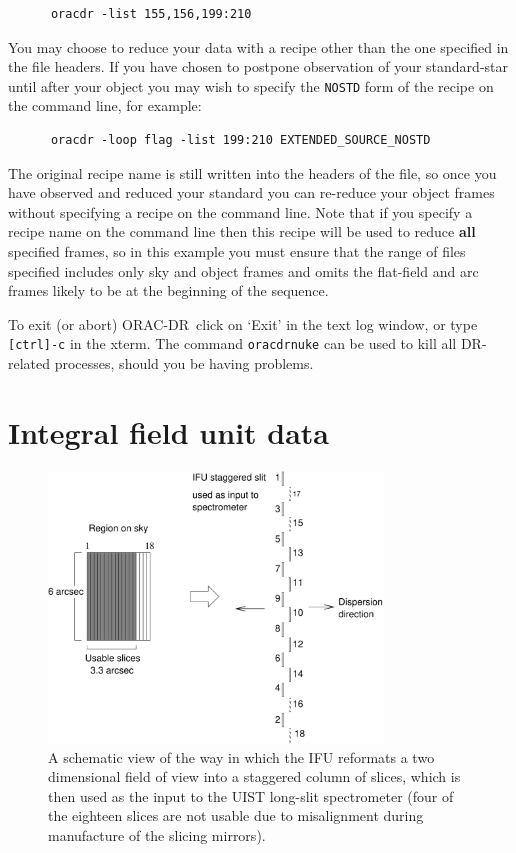 \documentclass[twoside,11pt]{article}
\renewcommand{\_}{\texttt{\symbol{95}}}
\newcommand{\ORACDR}{{\footnotesize ORAC-DR}}
\begin{document}
\begin{verbatim}
      oracdr -list 155,156,199:210
\end{verbatim}

You may choose to reduce your data with a recipe other than the one
specified in the file headers. If you have chosen to postpone
observation of your standard-star until after your object you may wish
to specify the {\tt \_NOSTD} form of the recipe on the command line,
for example:

\begin{verbatim}
      oracdr -loop flag -list 199:210 EXTENDED_SOURCE_NOSTD
\end{verbatim}

The original recipe name is still written into the headers of the
file, so once you have observed and reduced your standard you can
re-reduce your object frames without specifying a recipe on the
command line. Note that if you specify a recipe name on the command
line then this recipe will be used to reduce \textbf{all} specified
frames, so in this example you must ensure that the range of files
specified includes only sky and object frames and omits the flat-field
and arc frames likely to be at the beginning of the sequence.



To exit (or abort) \ORACDR\ click on `Exit' in the text log window, or
type {\tt [ctrl]-c} in the xterm. The command {\tt oracdr\_nuke} can
be used to kill all DR-related processes, should you be having
problems.


\section{Integral field unit data}

\begin{figure}
  \begin{center}
    \includegraphics[width=3.5in]{sun246_ifu_schematic}
    \caption{A schematic view of the way in which the IFU reformats a
      two dimensional field of view into a staggered column of slices,
      which is then used as the input to the UIST long-slit
      spectrometer (four of the eighteen slices are not usable due to
      misalignment during manufacture of the slicing mirrors).}
    \label{ifu_schematic}
  \end{center}
  \end{figure}
\end{document}
